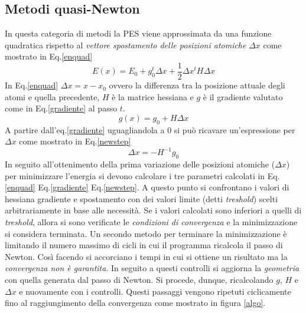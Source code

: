 \documentclass[oneside]{amsbook}
\numberwithin{section}{chapter}
\numberwithin{equation}{section}
\numberwithin{figure}{section}
\begin{document}
\subsection{Metodi quasi-Newton}
In questa categoria di metodi la PES viene approssimata da una funzione quadratica rispetto al \emph{vettore spostamento delle posizioni atomiche} $\Delta x$ come mostrato in Eq.\ref{enquad}
\begin{equation}
\label{enquad}
E(x) = E_0 +g_0^t \Delta x + \frac{1}{2} \Delta x^t H \Delta x
\end{equation}
In Eq.\ref{enquad} $\Delta x=x-x_0$ ovvero la differenza tra la posizione attuale degli atomi e quella precedente, $H$ è la matrice hessiana e  $g$ è il gradiente valutato come in Eq.\ref{gradiente} al passo $t$.
\begin{equation}
\label{gradiente}
 g(x)=g_0+H \Delta x
\end{equation}
A partire dall'eq.\ref{gradiente} uguagliandola a $0$ si può ricavare un'espressione per $\Delta x$ come mostrato in Eq.\ref{newstep}
\begin{equation}
\label{newstep}
\Delta x= -H^{-1}g_0
\end{equation}
In seguito all'ottenimento della prima variazione delle posizioni atomiche ($\Delta x$)  per minimizzare l'energia si devono calcolare i tre parametri calcolati in Eq.\ref{enquad}  Eq.\ref{gradiente}  Eq.\ref{newstep}. A questo punto si confrontano i valori di hessiana gradiente e spostamento con dei valori limite (detti \emph{treshold}) scelti arbitrariamente in base alle necessità. Se i valori calcolati sono inferiori a quelli di \emph{treshold}, allora si sono verificate le \emph{condizioni di convergenza} e la minimizzazione si considera terminata. 
Un secondo metodo per terminare la minimizzazione è limitando il numero massimo di cicli in cui il programma ricalcola il passo di Newton. Così facendo si accorciano i tempi in cui si ottiene un risultato ma la \emph{convergenza non è garantita}.
In seguito a questi controlli si aggiorna la \emph{geometria} con quella generata dal passo di Newton. Si procede, dunque, ricalcolando $g$, $H$ e $\Delta x$ e nuovamente con i controlli. Questi passaggi vengono ripetuti ciclicamente fino al raggiungimento della convergenza come mostrato in figura \ref{algo}.
\end{document}
